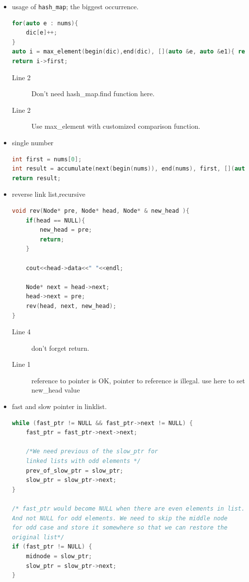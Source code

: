 \documentclass[a4paper,11pt,twoside]{book}
\begin{document}
\begin{itemize}
\item usage of \texttt{hash\_map}; the biggest occurrence. 
\begin{lstlisting}[frame=single, language=c++]	
for(auto e : nums){
	dic[e]++;
}
auto i = max_element(begin(dic),end(dic), [](auto &e, auto &e1){ return e.second< e1.second;});
return i->first;	
\end{lstlisting}
\begin{description}
	\item[Line 2] Don't need hash\_map.find function here.
	\item[Line 2] Use max\_element with customized comparison function.
	
\end{description}	
	
\item single number 
\begin{lstlisting}[frame=single, language=c++]	
int first = nums[0];
int result = accumulate(next(begin(nums)), end(nums), first, [](auto e, auto e1){ return e^e1; });
return result;	
\end{lstlisting}



\item reverse link list,recursive
\begin{lstlisting}[frame=single, language=c++]	
void rev(Node* pre, Node* head, Node* & new_head ){
	if(head == NULL){
		new_head = pre;
		return;
	}
	
	cout<<head->data<<" "<<endl;
	
	Node* next = head->next;
	head->next = pre;
	rev(head, next, new_head);
}	
\end{lstlisting}
\begin{description}
	\item[Line 4] don't forget return.
	\item[Line 1] reference to pointer is OK, pointer to reference is illegal. use here to set new\_head value
\end{description}


\item fast and slow pointer in linklist.	
\begin{lstlisting}[frame=single, language=c++]	
while (fast_ptr != NULL && fast_ptr->next != NULL) {
	fast_ptr = fast_ptr->next->next;
	
	/*We need previous of the slow_ptr for
	linked lists with odd elements */
	prev_of_slow_ptr = slow_ptr;
	slow_ptr = slow_ptr->next;
}

/* fast_ptr would become NULL when there are even elements in list.
And not NULL for odd elements. We need to skip the middle node
for odd case and store it somewhere so that we can restore the
original list*/
if (fast_ptr != NULL) {
	midnode = slow_ptr;
	slow_ptr = slow_ptr->next;
}
\end{lstlisting}	



\end{itemize}
\end{document}
